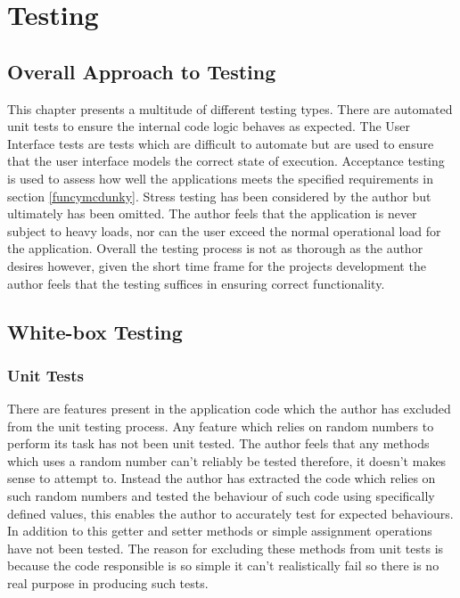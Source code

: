 \chapter{Testing}

\section{Overall Approach to Testing}

This chapter presents a multitude of different testing types. There are automated unit tests to ensure the internal code logic behaves as expected. The User Interface tests are tests which are difficult to automate but are used to ensure that the user interface models the correct state of execution. Acceptance testing is used to assess how well the applications meets the specified requirements in section \ref{funcymcdunky}. Stress testing has been considered by the author but ultimately has been omitted. The author feels that the application is never subject to heavy loads, nor can the user exceed the normal operational load for the application. Overall the testing process is not as thorough as the author desires however, given the short time frame for the projects development the author feels that the testing suffices in ensuring correct functionality.

\section{White-box Testing}
\subsection{Unit Tests}

There are features present in the application code which the author has excluded from the unit testing process. Any feature which relies on random numbers to perform its task has not been unit tested. The author feels that any methods which uses a random number can’t reliably be tested therefore, it doesn’t makes sense to attempt to. Instead the author has extracted the code which relies on such random numbers and tested the behaviour of such code using specifically defined values, this enables the author to accurately test for expected behaviours. In addition to this getter and setter methods or simple assignment operations have not been tested. The reason for excluding these methods from unit tests is because the code responsible is so simple it can’t realistically fail so there is no real purpose in producing such tests.

